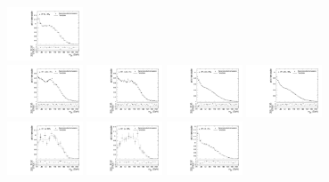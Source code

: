 \begin{figure}[htbp]
  \includegraphics[width=0.2\textwidth]{fig/analysisAppendix/templateVsReco_nonRes_r0_MJ_e_LP_bb_HDy.pdf}\\
  \includegraphics[width=0.2\textwidth]{fig/analysisAppendix/templateVsReco_nonRes_r0_MJ_mu_HP_nobb_HDy.pdf}
  \includegraphics[width=0.2\textwidth]{fig/analysisAppendix/templateVsReco_nonRes_r0_MJ_e_HP_nobb_HDy.pdf}
  \includegraphics[width=0.2\textwidth]{fig/analysisAppendix/templateVsReco_nonRes_r0_MJ_mu_LP_nobb_HDy.pdf}
  \includegraphics[width=0.2\textwidth]{fig/analysisAppendix/templateVsReco_nonRes_r0_MJ_e_LP_nobb_HDy.pdf}\\
  \includegraphics[width=0.2\textwidth]{fig/analysisAppendix/templateVsReco_nonRes_r0_MJ_mu_HP_vbf_HDy.pdf}
  \includegraphics[width=0.2\textwidth]{fig/analysisAppendix/templateVsReco_nonRes_r0_MJ_e_HP_vbf_HDy.pdf}
  \includegraphics[width=0.2\textwidth]{fig/analysisAppendix/templateVsReco_nonRes_r0_MJ_mu_LP_vbf_HDy.pdf}

\end{figure}
